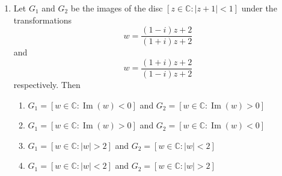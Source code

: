 \documentclass[journal]{IEEEtran}
\newcommand{\brak}[1]{\left( #1 \right)}
\newcommand{\sbrak}[1]{\left[ #1 \right]}
\newcommand{\abs}[1]{\left| #1 \right|}
\newcommand{\lt}{<}
\newcommand{\gt}{>}
\begin{document}
\begin{enumerate}
\item Let $G_1$ and $G_2$ be the images of the disc $\sbrak{z \in \mathbb{C} : \abs{z+1} \lt 1}$ under the transformations
  \[
  w = \frac{\brak{1-i}z + 2}{\brak{1+i}z + 2}
  \]
  and
  \[
  w = \frac{\brak{1+i}z + 2}{\brak{1-i}z + 2}
  \]
  respectively. Then  

  \begin{enumerate}
    \item $G_1 = \sbrak{w \in \mathbb{C} : \operatorname{Im}\brak{w} \lt 0}$ and $G_2 = \sbrak{w \in \mathbb{C} : \operatorname{Im}\brak{w} \gt 0}$
    \item $G_1 = \sbrak{w \in \mathbb{C} : \operatorname{Im}\brak{w} \gt 0}$ and $G_2 = \sbrak{w \in \mathbb{C} : \operatorname{Im}\brak{w} \lt 0}$
    \item $G_1 = \sbrak{w \in \mathbb{C} : \abs{w} \gt 2}$ and $G_2 = \sbrak{w \in \mathbb{C} : \abs{w} \lt 2}$
    \item $G_1 = \sbrak{w \in \mathbb{C} : \abs{w} \lt 2}$ and $G_2 = \sbrak{w \in \mathbb{C} : \abs{w} \gt 2}$
  \end{enumerate}


\end{enumerate}
\end{document}
